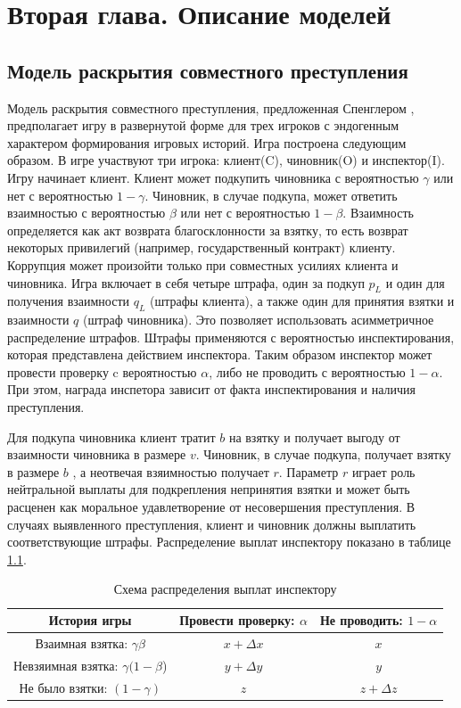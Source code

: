\chapter{Вторая глава. Описание моделей}
\label{cha:ch_2}
\section{Модель раскрытия совместного преступления}
Модель раскрытия совместного преступления, предложенная Спенглером \cite{Spengler}, предполагает игру в развернутой форме для трех игроков с эндогенным характером формирования игровых историй.
Игра построена следующим образом. В игре участвуют три игрока: клиент(C), чиновник(O) и инспектор(I). Игру начинает клиент. Клиент может подкупить чиновника с вероятностью $\gamma$ или нет с вероятностью $1 - \gamma$. Чиновник, в случае подкупа, может ответить взаимностью с вероятностью $\beta$ или нет с вероятностью $1 - \beta$. Взаимность определяется как акт возврата благосклонности за взятку, то есть возврат некоторых привилегий (например, государственный контракт) клиенту. Коррупция может произойти только при совместных усилиях клиента и чиновника. Игра включает в себя четыре штрафа, один за подкуп $p_L$ и один для получения взаимности $q_L$ (штрафы клиента), а также один для принятия взятки и взаимности $q$ (штраф чиновника). Это позволяет использовать асимметричное распределение штрафов. Штрафы применяются с вероятностью инспектирования, которая представлена действием инспектора. Таким образом инспектор может провести проверку c вероятностью $\alpha$, либо не проводить с вероятностью $1 - \alpha$. При этом, награда инспетора зависит от факта инспектирования и наличия преступления.
\par
Для подкупа чиновника клиент тратит $b$ на взятку и получает выгоду от взаимности чиновника в размере $v$. Чиновник, в случае подкупа, получает взятку в размере $b$ , а неотвечая взяимностью получает $r$. Параметр $r$ играет роль нейтральной выплаты для подкрепления непринятия взятки и может быть расценен как моральное удавлетворение от несовершения преступления. В случаях выявленного преступления, клиент и чиновник должны выплатить соответствующие штрафы. 
Распределение выплат инспектору показано в таблице \ref{tbl:inspr1}.
\begin{table}[H]
	\centering
	\begin{tabular}[t]{|c|c|c|}
		\hline
		История игры & Провести проверку: $\alpha$ & Не проводить: $1-\alpha$ \\
		\hline
		Взаимная взятка: $\gamma \beta$ & $x + \Delta x$ & $x$ \\
		\hline
		Невзяимная взятка: $\gamma (1 - \beta$) &  $y + \Delta y$ & $y$ \\
		\hline
		Не было взятки: $(1 - \gamma)$ &  $z$ & $z + \Delta z$ \\
		\hline
	\end{tabular}
	\caption{\centering Схема распределения выплат инспектору}
	\label{tbl:inspr1}
\end{table}
